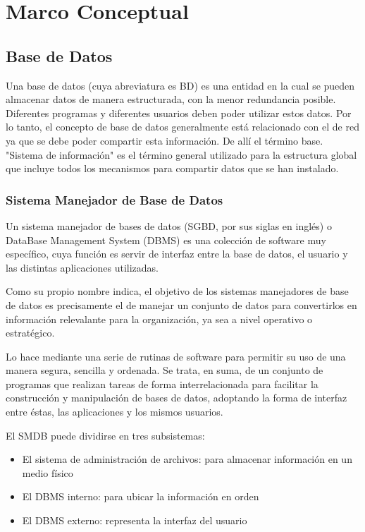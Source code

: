\chapter{Marco Conceptual}


\section{Base de Datos} 	
\setlength{\parskip}{5mm}
Una base de datos (cuya abreviatura es BD) es una entidad en la cual se pueden almacenar datos de manera estructurada, con la menor redundancia posible. Diferentes programas y diferentes usuarios deben poder utilizar estos datos. Por lo tanto, el concepto de base de datos generalmente está relacionado con el de red ya que se debe poder compartir esta información. De allí el término base. "Sistema de información" es el término general utilizado para la estructura global que incluye todos los mecanismos para compartir datos que se han instalado.

\citet{postgresbib}


\setlength{\parskip}{0mm}

\citet{bdbib}

\subsection{Sistema Manejador de Base de Datos}
\setlength{\parskip}{5mm}
Un sistema manejador de bases de datos (SGBD, por sus siglas en inglés) o DataBase Management System (DBMS) es una colección de software muy específico, cuya función es servir de interfaz entre la base de datos, el usuario y las distintas aplicaciones utilizadas.

Como su propio nombre indica, el objetivo de los sistemas manejadores de base de datos es precisamente el de manejar un conjunto de datos para convertirlos en información relevalante para la organización, ya sea a nivel operativo o estratégico.
 
Lo hace mediante una serie de rutinas de software para permitir su uso de una manera segura, sencilla y ordenada. Se trata, en suma, de un conjunto de programas que realizan tareas de forma interrelacionada para facilitar la construcción y manipulación de bases de datos, adoptando la forma de interfaz entre éstas, las aplicaciones y los mismos usuarios.

El SMDB puede dividirse en tres subsistemas:
\setlength{\parskip}{0mm}
\begin{itemize}

    \item El sistema de administración de archivos: para almacenar información en un medio físico
    
    \item El DBMS interno: para ubicar la información en orden
    
    \item El DBMS externo: representa la interfaz del usuario

\end{itemize}

